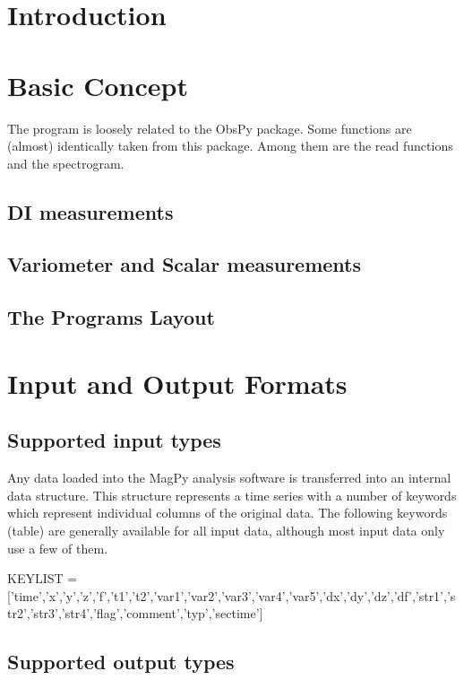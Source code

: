 \section{Introduction}


\section{Basic Concept}

The program is loosely related to the ObsPy package. Some functions are (almost) identically taken from this package. Among them are the read functions and the spectrogram.
   
\subsection{DI measurements}

\subsection{Variometer and Scalar measurements}

\subsection{The Programs Layout}


\section{Input and Output Formats}

\subsection{Supported input types}

Any data loaded into the MagPy analysis software is transferred into an internal data structure. This structure represents a time series with a number of keywords which represent individual columns of the original data. The following keywords (table) are generally available for all input data, although most input data only use a few of them.

KEYLIST = ['time','x','y','z','f','t1','t2','var1','var2','var3','var4','var5','dx','dy','dz','df','str1','str2','str3','str4','flag','comment','typ','sectime']


\subsection{Supported output types}

